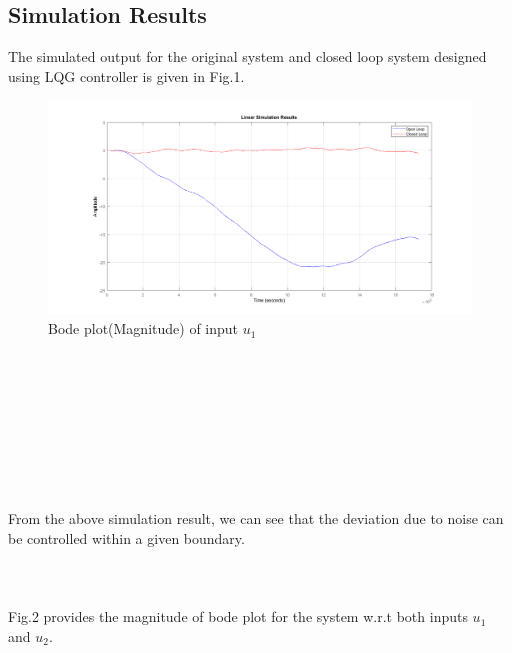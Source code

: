 \documentclass[journal,onecolumn]{IEEEtran}
\begin{document}
\subsection{Simulation Results}
The simulated output for the original system and closed loop system designed using LQG controller is given in Fig.1.\\
\begin{figure}[h!]
\centering

 \includegraphics[scale=0.35]{simulation.png}
  \caption{Bode plot(Magnitude) of input $u_1$}
\end{figure}
\\
\\
\\
\\
\\
\\
\\
\\
From the above simulation result, we can see that the deviation due to noise can be controlled within a given boundary.
\\
\\
\\
\\
Fig.2 provides the magnitude of bode plot for the system w.r.t both inputs $u_1$ and $u_2$.
\end{document}
